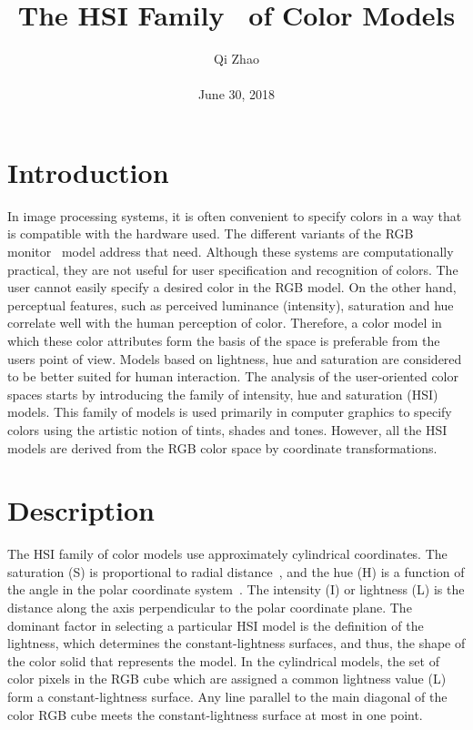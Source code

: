 \documentclass[10pt,twocolumn,letterpaper]{article}
\begin{document}
\title{The HSI Family~\cite{ibraheem2012understanding} of Color Models}
\author{Qi Zhao\\\\June 30, 2018}

\maketitle
\section{Introduction}
In image processing systems, it is often convenient to specify colors in a way that is compatible with the hardware used. The different variants of the RGB monitor~\cite{smith1978color} model address that need. Although these systems are computationally practical, they are not useful for user specification and recognition of colors. The user cannot easily specify a desired color in the RGB model. On the other hand, perceptual features, such as perceived luminance (intensity), saturation and hue correlate well with the human perception of color. Therefore, a color model in which these color attributes form the basis of the space is preferable from the users point of view. Models based on lightness, hue and saturation are considered to be better suited for human interaction. The analysis of the user-oriented color spaces starts by introducing the family of intensity, hue and saturation (HSI) models. This family of models is used primarily in computer graphics to specify colors using the artistic notion of tints, shades and tones. However, all the HSI models are derived from the RGB color space by coordinate transformations.

\section{Description}
The HSI family of color models use approximately cylindrical coordinates. The saturation (S) is proportional to radial distance~\cite{davis1999radial}, and the hue (H) is a function of the angle in the polar coordinate system~\cite{tanaka1977representation}. The intensity (I) or lightness (L) is the distance along the axis perpendicular to the polar coordinate plane. The dominant factor in selecting a particular HSI model is the definition of the lightness, which determines the constant-lightness surfaces, and thus, the shape of the color solid that represents the model. In the cylindrical models, the set of color pixels in the RGB cube which are assigned a common lightness value (L) form a constant-lightness surface. Any line parallel to the main diagonal of the color RGB cube meets the constant-lightness surface at most in one point.
\end{document}
